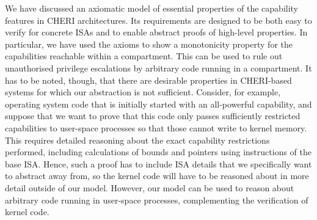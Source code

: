 \documentclass[11pt]{article}
\theoremstyle{definition}
\newcommand{\TODO}[1]{{\color{blue}[TODO: #1]}}
\begin{document}
We have discussed an axiomatic model of essential properties of the capability features in CHERI architectures.
Its requirements are designed to be both easy to verify for concrete ISAs and to enable abstract proofs of high-level properties.
In particular, we have used the axioms to show a monotonicity property for the capabilities reachable within a compartment.
This can be used to rule out unauthorised privilege escalations by arbitrary code running in a compartment.
It has to be noted, though, that there are desirable properties in CHERI-based systems for which our abstraction is not sufficient. %
Consider, for example, operating system code that is initially started with an all-powerful capability, and suppose that we want to prove that this code only passes sufficiently restricted capabilities to user-space processes so that those cannot write to kernel memory.
This requires detailed reasoning about the exact capability restrictions performed, including calculations of bounds and pointers using instructions of the base ISA. %
Hence, such a proof has to include ISA details that we specifically want to abstract away from, so the kernel code will have to be reasoned about in more detail outside of our model. %
However, our model can be used to reason about arbitrary code running in user-space processes, complementing the verification of kernel code.
\end{document}
